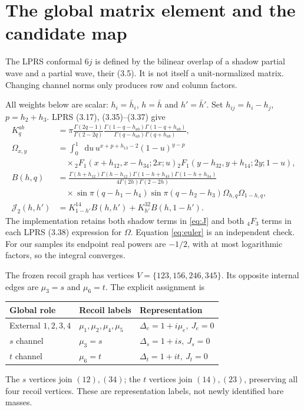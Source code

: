 \documentclass[11pt,a4paper]{article}
\newcommand{\dd}{\mathop{}\!\mathrm d}
\newcommand{\J}{\mathcal J_2}
\begin{document}
\newpage
\section{The global matrix element and the candidate map}
The LPRS conformal $6j$ \cite{lprs} is defined by the bilinear
overlap of a shadow partial wave and a partial wave, their (3.5).
It is not itself a unit-normalized matrix. Changing channel norms
only produces row and column factors.

All weights below are scalar: $h_i=\bar h_i$, $h=\bar h$ and
$h'=\bar h'$. Set $h_{ij}=h_i-h_j$, $p=h_2+h_3$. LPRS
(3.17), (3.35)--(3.37) give
\begin{align}
 K_q^{ab}
 &=\pi\frac{\Gamma(2q-1)}{\Gamma(2-2q)}
 \frac{\Gamma(1-q-h_{ab})\Gamma(1-q+h_{ab})}
 {\Gamma(q-h_{ab})\Gamma(q+h_{ab})},\\
 \Omega_{x,y}
 &=\int_0^1\dd u\,u^{x+p+h_{13}-2}(1-u)^{y-p}\nonumber\\
 &\quad{}\times{}_2F_1(x+h_{12},x-h_{34};2x;u)
 {}_2F_1(y-h_{32},y+h_{14};2y;1-u),\label{eq:euler}\\
 B(h,q)
 &=\frac{\Gamma(h+h_{12})\Gamma(h-h_{12})
 \Gamma(1-h+h_{43})\Gamma(1-h+h_{34})}
 {4\Gamma(2h)\Gamma(2-2h)}\nonumber\\
 &\quad{}\times\sin\pi(q-h_1-h_4)\sin\pi(q-h_2-h_3)
 \Omega_{h,q}\Omega_{1-h,q},\\
 \J(h,h')&=K_{1-h'}^{14}B(h,h')+K_{h'}^{32}B(h,1-h').
 \label{eq:J}
\end{align}
The implementation retains both shadow terms in \eqref{eq:J}
and both \({}_4F_3\) terms in each LPRS (3.38) expression for
$\Omega$. Equation \eqref{eq:euler} is an independent check.
For our samples its endpoint real powers are $-1/2$, with at
most logarithmic factors, so the integral converges.

The frozen recoil graph has vertices $V=\{123,156,246,345\}$.
Its opposite internal edges are $\mu_3=s$ and $\mu_6=t$.
The explicit assignment is
\begin{center}
\begin{tabular}{lll}
\toprule
Global role & Recoil labels & Representation\\
\midrule
External $1,2,3,4$ & $\mu_1,\mu_2,\mu_4,\mu_5$ & $\Delta_e=1+i\mu_e,\ J_e=0$\\
$s$ channel & $\mu_3=s$ & $\Delta_s=1+is,\ J_s=0$\\
$t$ channel & $\mu_6=t$ & $\Delta_t=1+it,\ J_t=0$\\
\bottomrule
\end{tabular}
\end{center}
The $s$ vertices join $(12),(34)$; the $t$ vertices join
$(14),(23)$, preserving all four recoil vertices.
These are representation labels, not newly identified bare masses.
\end{document}
